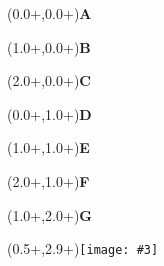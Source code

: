 \documentclass{article}
\newlength{\panelWidth} \newlength{\panelHeight}
\newlength{\labXshift} \newlength{\labYshift}
\newlength{\picXshift} \newlength{\picYshift}
\newlength{\txtXshift} \newlength{\txtYshift}
\newlength{\picWidth}
\newcommand{\txt}[3]{\begin{textblock*}{\panelWidth}(#1+\txtXshift,#2+\txtYshift){#3}\end{textblock*}}
\newcommand{\lab}[3]{\begin{textblock*}{\panelWidth}(#1+\labXshift,#2+\labYshift)\textbf{\LARGE #3}\end{textblock*}}
\newcommand{\pic}[3]{\begin{textblock*}{\panelWidth}(#1+\picXshift,#2+\picYshift)\texttt{[image: \#3]}\end{textblock*}}
\newcommand{\widepic}[4]{\begin{textblock*}{\panelWidth}(#1+\picXshift,#2+\picYshift)\texttt{[image: \#4]}\end{textblock*}}
\newcommand{\fig}[5]{ \lab{#1}{#2}{#3} \pic{#1}{#2}{#4} \txt{#1}{#2}{#5} }
\begin{document}

\lab{0.0\panelWidth}{0.0\panelHeight}{A}%
\lab{1.0\panelWidth}{0.0\panelHeight}{B}%
\lab{2.0\panelWidth}{0.0\panelHeight}{C}%

\lab{0.0\panelWidth}{1.0\panelHeight}{D}%
\lab{1.0\panelWidth}{1.0\panelHeight}{E}%
\lab{2.0\panelWidth}{1.0\panelHeight}{F}%

\lab{1.0\panelWidth}{2.0\panelHeight}{G}

\pic{0.5\panelWidth}{2.9\panelHeight}{../output/species_legend_h.pdf}
\end{document}
